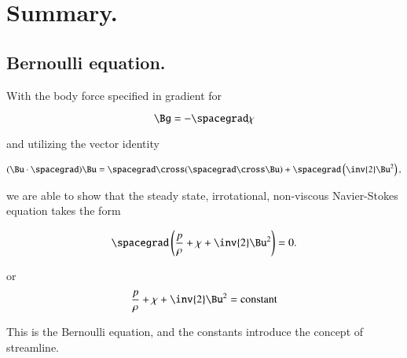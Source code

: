 \section{Summary.}
\subsection{Bernoulli equation.}

With the body force specified in gradient for

\begin{equation}\label{eqn:continuumFluidsReview:2290}
\Bg = - \spacegrad \chi
\end{equation}

and utilizing the vector identity

\begin{equation}\label{eqn:continuumFluidsReview:2310}
(\Bu \cdot \spacegrad) \Bu = \spacegrad \cross (\spacegrad \cross \Bu) + \spacegrad \left( \inv{2} \Bu^2 \right),
\end{equation}

we are able to show that the steady state, irrotational, non-viscous Navier-Stokes equation takes the form

\begin{equation}\label{eqn:continuumFluidsReview:2330}
\spacegrad \left( \frac{p}{\rho} + \chi + \inv{2} \Bu^2 \right) = 0.
\end{equation}

or
\begin{equation}\label{eqn:continuumFluidsReview:2350}
\frac{p}{\rho} + \chi + \inv{2} \Bu^2 = \text{constant}
\end{equation}

This is the Bernoulli equation, and the constants introduce the concept of streamline.  


